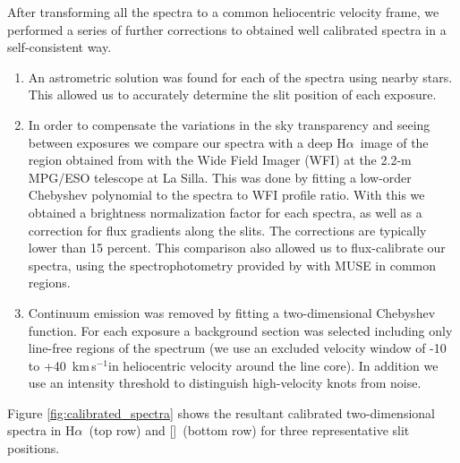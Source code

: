 \documentclass[a4paper,fleqn,usenatbib]{mnras}     %
\newcommand{\Ha} {H$\alpha$}      		%
\newcommand{\NII} {[\ion{N}{ii}]}            %
\newcommand{\kms}{\,km\,s$^{-1}$}	       %
\begin{document}
After transforming all the spectra to a common heliocentric velocity frame, we performed a series of further 
corrections to obtained well calibrated spectra in a self-consistent way.
\begin{enumerate}

\item An astrometric solution was found for each of the spectra using nearby stars. This allowed us to 
accurately determine the slit position of each exposure.

\item In order to compensate the variations in the sky transparency and seeing between exposures we compare 
our spectra with a deep \Ha~image of the region obtained from \citet{DaRio2009} with the Wide Field Imager (WFI) 
at the 2.2-m MPG/ESO telescope at La Silla. This was done by fitting a low-order Chebyshev polynomial to the 
spectra to WFI profile ratio. With this we obtained a brightness normalization factor for each spectra, as well as a 
correction for flux gradients along the slits. The corrections are typically lower than 15 percent. This comparison also allowed 
us to flux-calibrate our spectra, using the spectrophotometry provided by \citet{Weilbacher2015} with MUSE in common regions. 

\item Continuum emission was removed by fitting a two-dimensional Chebyshev function. For each exposure a 
background section was selected including only line-free regions of the spectrum (we use an excluded velocity window 
of -10 to +40 \kms in heliocentric velocity around the line core). In addition we use an intensity threshold to distinguish high-velocity 
knots from noise.
\end{enumerate}

Figure \ref{fig:calibrated_spectra} shows the resultant calibrated two-dimensional spectra in \Ha~(top row) and \NII~(bottom row) for three 
representative slit positions.
\end{document}
